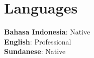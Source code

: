 \documentclass[a4paper, 11pt]{article}
\begin{document}
\section{Languages}
 \begin{itemize}[leftmargin=0.1in, label={}]
    \small{\item{
     \textbf{Bahasa Indonesia}{: Native} \\
     \textbf{English}{: Professional} \\
     \textbf{Sundanese}{: Native}
    }}
 \end{itemize}
\end{document}
